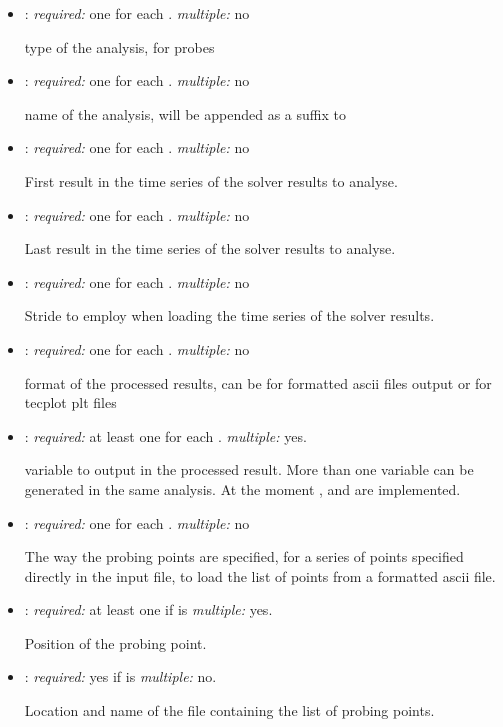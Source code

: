 \begin{itemize}
\item {}: \textit{required:} one for each . \textit{multiple:} no

type of the analysis,  for probes

\item {}: \textit{required:} one for each . \textit{multiple:} no

name of the analysis, will be appended as a suffix to 

\item {}: \textit{required:} one for each . \textit{multiple:} no

First result in the time series of the solver results to analyse.

\item {}: \textit{required:} one for each . \textit{multiple:} no

Last result in the time series of the solver results to analyse.

\item {}: \textit{required:} one for each . \textit{multiple:} no

Stride to employ when loading the time series of the solver results. 

\item {}: \textit{required:} one for each . \textit{multiple:} no

format of the processed results, can be  for formatted ascii files output or  for tecplot plt files

\item {}: \textit{required:} at least one for each . \textit{multiple:} yes.

variable to output in the processed result. More than one variable can be generated in the same analysis. At the moment ,  and  are implemented.

\item {}: \textit{required:} one for each . \textit{multiple:} no

The way the probing points are specified,  for a series of points specified directly in the input file,  to load the list of points from a formatted ascii file.

\item {}: \textit{required:} at least one if  is  \textit{multiple:} yes.

Position of the probing point.

\item {}: \textit{required:} yes if  is  \textit{multiple:} no.

Location and name of the file containing the list of probing points.

\end{itemize}

